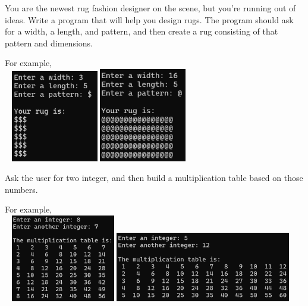 

	\item  
		You are the newest rug fashion designer on the scene, but you're running out of ideas. 
		Write a program that will help you design rugs.  The program should ask for a width, 
		a length, and pattern, and then create a rug consisting of that pattern and dimensions.

		For example, \\ \ \hfill
		\includegraphics[width = 1.5in]{./imgs/rug1.PNG} \hfill  
		\includegraphics[width = 1.5in]{./imgs/rug2.PNG} \hfill \


	\item   
		Ask the user for two integer, and then build a multiplication table based on those numbers.

		For example, \\ \ \hfill
		\includegraphics[height = 1.5in]{./imgs/mult_table1.PNG} \hfill  
		\includegraphics[height = 1.2in]{./imgs/mult_table2.PNG} \hfill  \


